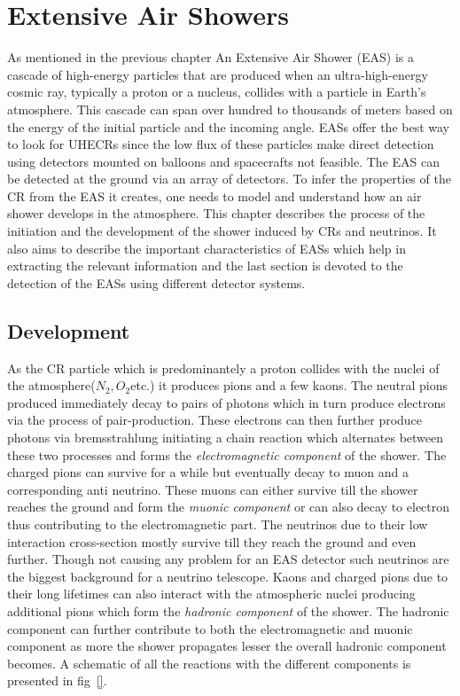
\chapter{Extensive Air Showers}
\label{chap:EAS}

As mentioned in the previous chapter An Extensive Air Shower (EAS) is a cascade of high-energy particles that are produced when an ultra-high-energy cosmic ray, typically a proton or a nucleus, collides with a particle in Earth's atmosphere. This cascade can span over hundred to thousands of meters based on the energy of the initial particle and the incoming angle. EASs offer the best way to look for UHECRs since the low flux of these particles make direct detection using detectors mounted on balloons and spacecrafts not feasible. The EAS can be detected at the ground via an array of detectors. To infer the properties of the CR from the EAS it creates, one needs to model and understand how an air shower develops in the atmosphere. This chapter describes the process of the initiation and the development of the shower induced by CRs and neutrinos. It also aims to describe the important characteristics of EASs which help in extracting the relevant information and the last section is devoted to the detection of the EASs using different detector systems. 

\section{Development}
\label{sec:EAS_dev}
As the CR particle which is predominantely a proton collides with the nuclei of the atmosphere($N_2, O_2 $etc.) it produces pions and a few kaons. The neutral pions produced immediately decay to pairs of photons which in turn produce electrons via the process of pair-production. These electrons can then further produce photons via bremsstrahlung initiating a chain reaction which alternates between these two processes and forms the \textit{electromagnetic component} of the shower. The charged pions can survive for a while but eventually decay to muon and a corresponding anti neutrino. These muons can either survive till the shower reaches the ground and form the \textit{muonic component} or can also decay to electron thus contributing to the electromagnetic part. The neutrinos due to their low interaction cross-section mostly survive till they reach the ground and even further. Though not causing any problem for an EAS detector such neutrinos are the biggest background for a neutrino telescope. Kaons and charged pions due to their long lifetimes can also interact with the atmospheric nuclei producing additional pions which form the \textit{hadronic component} of the shower. The hadronic component can further contribute to both the electromagnetic and muonic component as more the shower propagates lesser the overall hadronic component becomes. A schematic of all the reactions with the different components is presented in fig~\ref{}.

